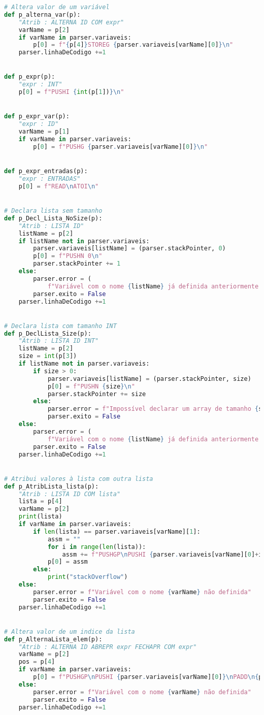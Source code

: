\documentclass[11pt,a4paper]{report}%
\begin{document}
\begin{scriptsize}
\begin{lstlisting}[language=python]
# Altera valor de um variável
def p_alterna_var(p):
    "Atrib : ALTERNA ID COM expr"
    varName = p[2]
    if varName in parser.variaveis:
        p[0] = f"{p[4]}STOREG {parser.variaveis[varName][0]}\n"
    parser.linhaDeCodigo +=1


def p_expr(p):
    "expr : INT"
    p[0] = f"PUSHI {int(p[1])}\n"


def p_expr_var(p):
    "expr : ID"
    varName = p[1]
    if varName in parser.variaveis:
        p[0] = f"PUSHG {parser.variaveis[varName][0]}\n"


def p_expr_entradas(p):
    "expr : ENTRADAS"
    p[0] = f"READ\nATOI\n"


# Declara lista sem tamanho
def p_Decl_Lista_NoSize(p):
    "Atrib : LISTA ID"
    listName = p[2]
    if listName not in parser.variaveis:
        parser.variaveis[listName] = (parser.stackPointer, 0)
        p[0] = f"PUSHN 0\n"
        parser.stackPointer += 1
    else:
        parser.error = (
            f"Variável com o nome {listName} já definida anteriormente.")
        parser.exito = False
    parser.linhaDeCodigo +=1


# Declara lista com tamanho INT
def p_DeclLista_Size(p):
    "Atrib : LISTA ID INT"
    listName = p[2]
    size = int(p[3])
    if listName not in parser.variaveis:
        if size > 0:
            parser.variaveis[listName] = (parser.stackPointer, size)
            p[0] = f"PUSHN {size}\n"
            parser.stackPointer += size
        else:
            parser.error = f"Impossível declarar um array de tamanho {size}"
            parser.exito = False
    else:
        parser.error = (
            f"Variável com o nome {listName} já definida anteriormente.")
        parser.exito = False
    parser.linhaDeCodigo +=1


# Atribui valores à lista com outra lista
def p_AtribLista_lista(p):
    "Atrib : LISTA ID COM lista"
    lista = p[4]
    varName = p[2]
    print(lista)
    if varName in parser.variaveis:
        if len(lista) == parser.variaveis[varName][1]:
            assm = ""
            for i in range(len(lista)):
                assm += f"PUSHGP\nPUSHI {parser.variaveis[varName][0]+i}\nPUSHI {int(lista[i])}\nSTOREN\n"
            p[0] = assm
        else:
            print("stackOverflow")
    else:
        parser.error = f"Variável com o nome {varName} não definida"
        parser.exito = False
    parser.linhaDeCodigo +=1


# Altera valor de um indice da lista
def p_AlternaLista_elem(p):
    "Atrib : ALTERNA ID ABREPR expr FECHAPR COM expr"
    varName = p[2]
    pos = p[4]
    if varName in parser.variaveis:
        p[0] = f"PUSHGP\nPUSHI {parser.variaveis[varName][0]}\nPADD\n{p[4]}{p[7]}STOREN\n"
    else:
        parser.error = f"Variável com o nome {varName} não definida"
        parser.exito = False
    parser.linhaDeCodigo +=1



\end{lstlisting}
\end{scriptsize}
\end{document}
